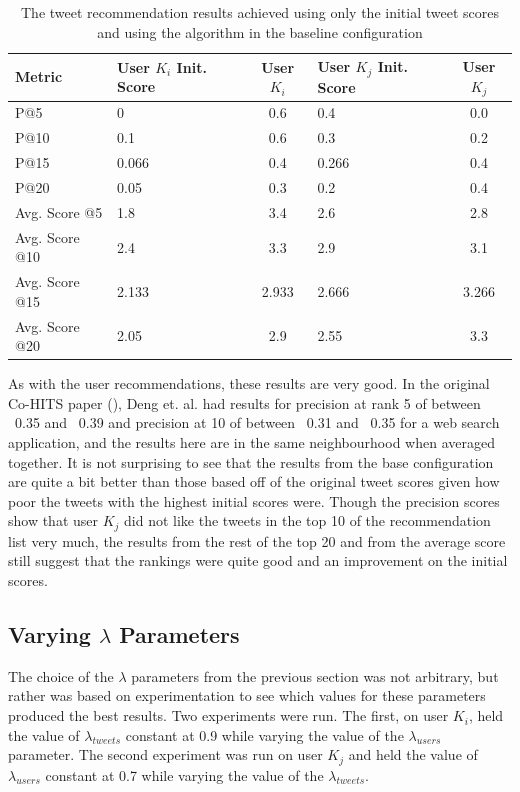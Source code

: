 \begin{table}
\centering
\begin{tabular}{l|p{2.25cm}|c|p{2.25cm}|c}
{\bf Metric}& {\bf User $K_{i}$ Init. Score} & {\bf User $K_{i}$} & {\bf User $K_{j}$ Init. Score} & {\bf User $K_{j}$} \\ \hline
P@5   & 0 & 0.6 & 0.4 & 0.0 \\ \hline
P@10 & 0.1 & 0.6 & 0.3 & 0.2 \\ \hline
P@15 & 0.066 & 0.4 & 0.266 & 0.4 \\ \hline
P@20 & 0.05 & 0.3 & 0.2 & 0.4 \\ \hline
Avg. Score @5   & 1.8 & 3.4 & 2.6 & 2.8 \\ \hline
Avg. Score @10 & 2.4 & 3.3 & 2.9 & 3.1 \\ \hline
Avg. Score @15 & 2.133 & 2.933 & 2.666 & 3.266 \\ \hline
Avg. Score @20 & 2.05 & 2.9 & 2.55 & 3.3 \\
\end{tabular}
\caption{The tweet recommendation results achieved using only the initial tweet scores and using the algorithm in the baseline configuration}
\label{tab:BaseTweetResults}
\end{table}

As with the user recommendations, these results are very good. In the original Co-HITS paper (\cite{Deng2009}), Deng et. al. had results for precision at rank 5 of between ~0.35 and ~0.39 and precision at 10 of between ~0.31 and ~0.35 for a web search application, and the results here are in the same neighbourhood when averaged together. It is not surprising to see that the results from the base configuration are quite a bit better than those based off of the original tweet scores given how poor the tweets with the highest initial scores were. Though the precision scores show that user $K_{j}$ did not like the tweets in the top 10 of the recommendation list very much, the results from the rest of the top 20 and from the average score still suggest that the rankings were quite good and an improvement on the initial scores.



\subsection{Varying $\lambda$ Parameters}
\label{sec:VaryingLambda}

The choice of the $\lambda$ parameters from the previous section was not arbitrary, but rather was based on experimentation to see which values for these parameters produced the best results. Two experiments were run. The first, on user $K_{i}$, held the value of $\lambda_{tweets}$ constant at 0.9 while varying the value of the $\lambda_{users}$ parameter. The second experiment was run on user $K_{j}$ and held the value of $\lambda_{users}$ constant at 0.7 while varying the value of the $\lambda_{tweets}$.

